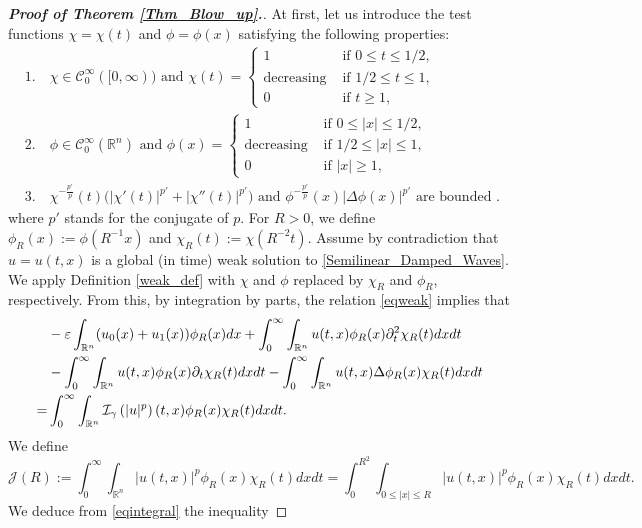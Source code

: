 \documentclass[10pt,a4paper]{amsart}
\begin{document}
\begin{proof}[\textbf{Proof of Theorem \ref{Thm_Blow_up}.}]
At first, let us introduce the test functions $\chi= \chi(t)$ and $\phi=\phi(x)$ satisfying the following properties:
\begin{align*}
&1.\quad \chi \in \mathcal{C}_0^\infty([0,\infty)) \text{ and }
\chi(t)=
\begin{cases}
1 &\text{ if } 0 \leq t \leq 1/2, \\
\text{decreasing} &\text{ if } 1/2\leq t\leq 1, \\
0 &\text{ if } t \geq 1,
\end{cases} & \nonumber \\
&2.\quad \phi \in \mathcal{C}_0^\infty(\mathbb{R}^n) \text{ and }
\phi(x)=
\begin{cases}
1 &\text{ if }0 \leq |x| \leq 1/2, \\
\text{decreasing} &\text{ if } 1/2\leq |x| \leq 1, \\
0 &\text{ if } |x| \geq 1,
\end{cases} & \nonumber \\
&3.\quad \chi^{-\frac{p'}{p}}(t)\big(|\chi'(t)|^{p'}+|\chi''(t)|^{p'}\big) \text{ and } \phi^{-\frac{p'}{p}}(x)\left|\Delta \phi(x)\right|^{p'} \text{ are bounded }.
\end{align*}
where $p'$ stands for the conjugate of $p$. For $R>0$, we define $\phi_R(x):=\phi(R^{-1}x)$ and $\chi_R(t):=\chi(R^{-2}t)$. Assume by contradiction that $u=u(t,x)$ is a global (in time) weak solution to \eqref{Semilinear_Damped_Waves}.
 We apply Definition \ref{weak_def} with $\chi$ and $\phi$ replaced by $\chi_R$ and $\phi_R$, respectively.
From this, by integration by parts, the relation \eqref{eqweak} implies that
\begin{align}\label{eqintegral}
&-\varepsilon\int_{\mathbb{R}^n}(u_0(x)+u_1(x))\phi_R(x)dx+\int_0^{\infty}\int_{\mathbb{R}^n}u(t, x)\phi_R(x)\partial_t^2\chi_R(t) dxdt \notag\\
&-\int_0^{\infty}\int_{\mathbb{R}^n} u(t, x)\phi_R(x)\partial_t\chi_R(t)dxdt-\int_0^{\infty}\int_{\mathbb{R}^n}u(t, x)\Delta  \phi_R(x)\chi_R(t)dxdt \notag\\ =&\int_0^{\infty}\int_{\mathbb{R}^n}\mathcal{I}_{\gamma} \left(|u|^p\right)(t,x)\phi_R(x)\chi_{R}(t)dxdt.
\end{align}
We define
$$
\mathcal{J}(R):=\int_0^{\infty}\int_{\mathbb{R}^n}|u(t, x)|^p \phi_R(x)\chi_R(t)dxdt=\int_0^{R^2}\int_{0 \leq|x| \leq R}|u(t, x)|^p \phi_R(x)\chi_R(t)dxdt.
$$
We deduce from \eqref{eqintegral} the inequality

\end{proof}
\end{document}
